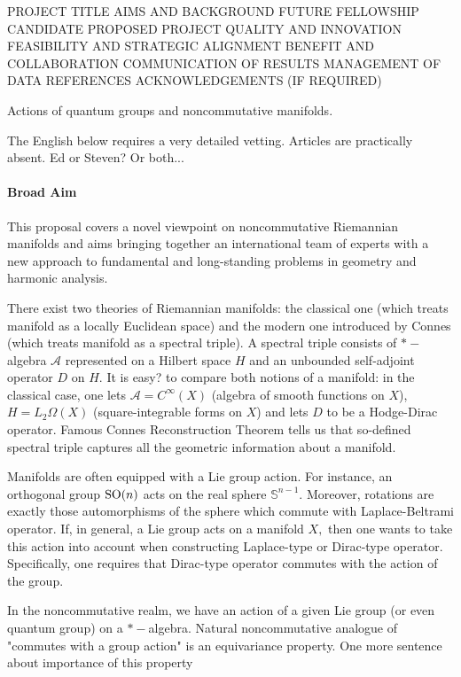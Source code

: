 \documentclass{article}
\newcommand{\archeading}[1]{\vspace{.3cm} \noindent{\bfseries #1} \vspace{.1cm}   }
\begin{document}
\parindent=20pt
\pagestyle{empty}
\newpage


PROJECT TITLE
AIMS AND BACKGROUND
FUTURE FELLOWSHIP CANDIDATE
PROPOSED PROJECT QUALITY AND INNOVATION
FEASIBILITY AND STRATEGIC ALIGNMENT
BENEFIT AND COLLABORATION
COMMUNICATION OF RESULTS
MANAGEMENT OF DATA
REFERENCES
ACKNOWLEDGEMENTS (IF REQUIRED)


\archeading{Project Title} Actions of quantum groups and noncommutative manifolds.

\bigskip\archeading{Aims and Background}

{\color{blue} The English below requires a very detailed vetting. Articles are practically absent. Ed or Steven? Or both...}

\paragraph*{Broad Aim} This proposal covers a novel viewpoint on noncommutative Riemannian manifolds and aims bringing together an international team of experts with a new approach to fundamental and long-standing problems in geometry and harmonic analysis.

There exist two theories of Riemannian manifolds: the classical one (which treats manifold as a locally Euclidean space) and the modern one introduced by Connes (which treats manifold as a spectral triple). A spectral triple consists of $\ast-$algebra $\mathcal{A}$ represented on a Hilbert space $H$ and an unbounded self-adjoint operator $D$ on $H.$ {\color{red} It is easy?} to compare both notions of a manifold: in the classical case, one lets $\mathcal{A}=C^{\infty}(X)$ (algebra of smooth functions on $X$), $H=L_2\Omega(X)$ (square-integrable forms on $X$) and lets $D$ to be a Hodge-Dirac operator. Famous Connes Reconstruction Theorem \cite{Connes-reconstruction} tells us that so-defined spectral triple captures all the geometric information about a manifold.

Manifolds are often equipped with a Lie group action. For instance, an orthogonal group ${\rm SO}(n)$ acts on the real sphere $\mathbb{S}^{n-1}.$ Moreover, rotations are exactly those automorphisms of the sphere which commute with Laplace-Beltrami operator. If, in general, a Lie group acts on a manifold $X,$ then one wants to take this action into account when constructing Laplace-type or Dirac-type operator. Specifically, one requires that Dirac-type operator commutes with the action of the group.

In the noncommutative realm, we have an action of a given Lie group (or even quantum group) on a $\ast-$algebra. Natural noncommutative analogue of "commutes with a group action" is an equivariance property. {\color{blue} One more sentence about importance of this property}
\end{document}
